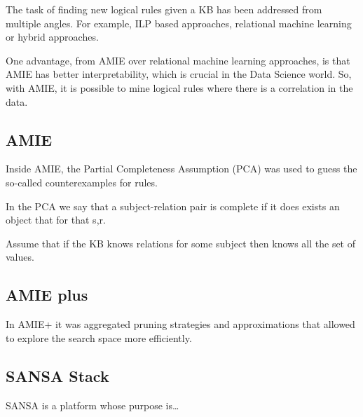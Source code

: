 \documentclass{article}
\begin{document}
The task of finding new logical rules given a KB has been addressed from
multiple angles. For example, ILP based approaches, relational machine learning
or hybrid approaches.

One advantage, from AMIE over relational machine learning approaches, is that
AMIE has better interpretability, which is crucial in the Data Science world.
So, with AMIE, it is possible to mine logical rules where there is a
correlation in the data.

\subsection{AMIE}

Inside AMIE, the Partial Completeness Assumption (PCA) was used to guess the
so-called counterexamples for rules.

In the PCA we say that a subject-relation pair is complete if it does exists
an object that for that s,r.

Assume that if the KB knows relations for some subject then knows all the set
of values.


\subsection{AMIE plus}

In AMIE+ it was aggregated pruning strategies and approximations that allowed
to explore the search space more efficiently.

\subsection{SANSA Stack}

SANSA is a platform whose purpose is\ldots



\end{document}
